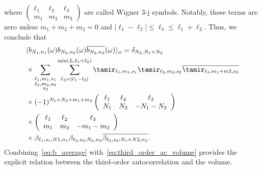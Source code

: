 \documentclass[9pt,twocolumn,twoside,lineno]{pnas-new}
\begin{document}
where  $\left(\begin{array}{ccc} \ell_1 & \ell_2 & \ell_3\\ m_1 & m_2 & m_3\end{array}\right)$ are called Wigner 3-j symbols. 
Notably, these terms are zero unless $m_1+m_2+m_3=0$ and $|\ell_1-\ell_2|\leq \ell_3\leq \ell_1+\ell_2$. Thus,  we conclude that 
\begin{align} \label{eq:b_average}
&\langle b_{N_1,n_1}(\omega)b_{N_2,n_2}(\omega)\overline{b_{N_3,n_3}}(\omega)\rangle_{\omega} = \delta_{N_3,N_1+N_2}\\&\times \sum_{\substack{\ell_1,m_1,s_1\\\ell_2,m_2,s_2\\s_3}}\sum_{\ell_3=|\ell_1-\ell_2|}^{\min(L,\ell_1+\ell_2)}\tamir_{\ell_1,m_1,s_1}\tamir_{\ell_2,m_2,s_2}\overline{\tamir_{\ell_3,m_1+m2,s_3}}\nonumber\\
&\times (-1)^{N_1+N_2+m_1+m_2}\left(\begin{array}{ccc}\ell_1 & \ell_2  & \ell_3\\ N_1 & N_2 & -N_1-N_2\end{array}\right)\nonumber\\&\times \left(\begin{array}{ccc}\ell_1 & \ell_2  & \ell_3\\ m_1 & m_2 & -m_1-m_2\end{array}\right)\nonumber\\
&\times \beta_{\ell_1,s_1;N1,n_1}\beta_{\ell_2,s_2;N_2,n_2}\overline{\beta_{\ell_3,s_3;N_1+N2,n_3}}. \nonumber
\end{align}
Combining~\eqref{eq:b_average} with~\eqref{eq:third_order_ac_volume} provides the explicit relation between the third-order autocorrelation and the volume.   
\end{document}
